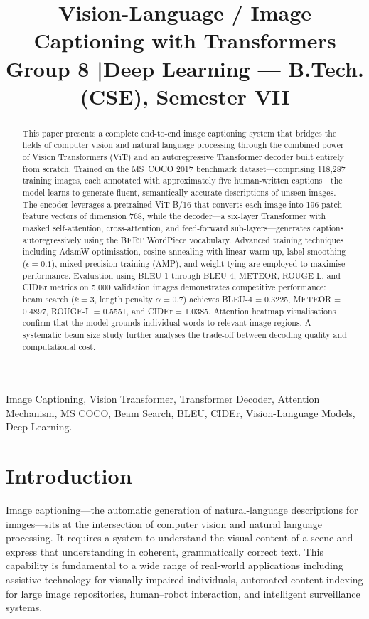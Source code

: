 \documentclass[conference]{IEEEtran}
\title{Vision-Language / Image Captioning with Transformers\\
\large Group 8 \quad|\quad Deep Learning --- B.Tech. (CSE), Semester VII}
\author{
    \IEEEauthorblockN{Syed Waseem Irfan}
    \IEEEauthorblockA{\textit{Dept. of Computer Science and Engineering} \\
    Roll No: 2023BCS0100}
    \and
    \IEEEauthorblockN{K Sumith}
    \IEEEauthorblockA{\textit{Dept. of Computer Science and Engineering} \\
    Roll No: 2023BCS0124}
    \and
    \IEEEauthorblockN{B Yogendra}
    \IEEEauthorblockA{\textit{Dept. of Computer Science and Engineering} \\
    Roll No: 2023BCS0146}
}
\begin{document}
\maketitle

\begin{abstract}
This paper presents a complete end-to-end image captioning system that bridges the fields of computer vision and natural language processing through the combined power of Vision Transformers (ViT) and an autoregressive Transformer decoder built entirely from scratch. Trained on the MS~COCO 2017 benchmark dataset---comprising 118,287 training images, each annotated with approximately five human-written captions---the model learns to generate fluent, semantically accurate descriptions of unseen images. The encoder leverages a pretrained ViT-B/16 that converts each image into 196 patch feature vectors of dimension 768, while the decoder---a six-layer Transformer with masked self-attention, cross-attention, and feed-forward sub-layers---generates captions autoregressively using the BERT WordPiece vocabulary. Advanced training techniques including AdamW optimisation, cosine annealing with linear warm-up, label smoothing ($\epsilon=0.1$), mixed precision training (AMP), and weight tying are employed to maximise performance. Evaluation using BLEU-1 through BLEU-4, METEOR, ROUGE-L, and CIDEr metrics on 5,000 validation images demonstrates competitive performance: beam search ($k=3$, length penalty $\alpha=0.7$) achieves BLEU-4 = 0.3225, METEOR = 0.4897, ROUGE-L = 0.5551, and CIDEr = 1.0385. Attention heatmap visualisations confirm that the model grounds individual words to relevant image regions. A systematic beam size study further analyses the trade-off between decoding quality and computational cost.
\end{abstract}

\begin{IEEEkeywords}
Image Captioning, Vision Transformer, Transformer Decoder, Attention Mechanism, MS COCO, Beam Search, BLEU, CIDEr, Vision-Language Models, Deep Learning.
\end{IEEEkeywords}

\section{Introduction}
Image captioning---the automatic generation of natural-language descriptions for images---sits at the intersection of computer vision and natural language processing. It requires a system to understand the visual content of a scene and express that understanding in coherent, grammatically correct text. This capability is fundamental to a wide range of real-world applications including assistive technology for visually impaired individuals, automated content indexing for large image repositories, human--robot interaction, and intelligent surveillance systems.
\end{document}
